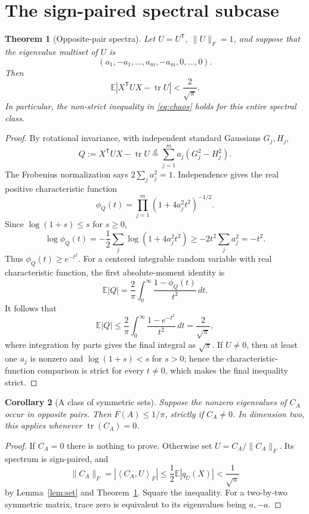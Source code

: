 \documentclass[11pt]{article}
\newtheorem{theorem}{Theorem}
\newtheorem{corollary}[theorem]{Corollary}
\newcommand{\E}{\mathbb E}
\newcommand{\tr}{\operatorname{tr}}
\newcommand{\ip}[2]{\left\langle #1,#2\right\rangle}
\begin{document}
\section{The sign-paired spectral subcase}

\begin{theorem}[Opposite-pair spectra]\label{thm:pairs}
Let $U=U^{\mathsf T}$, $\|U\|_F=1$, and suppose that the eigenvalue multiset
of $U$ is
\[
 (a_1,-a_1,\ldots,a_m,-a_m,0,\ldots,0).
\]
Then
\[
 \E\left|X^{\mathsf T}UX-\tr U\right|<\frac{2}{\sqrt\pi}.
\]
In particular, the non-strict inequality in \eqref{eq:chaos} holds for this
entire spectral class.
\end{theorem}

\begin{proof}
By rotational invariance, with independent standard Gaussians $G_j,H_j$,
\[
 Q:=X^{\mathsf T}UX-\tr U
 \stackrel{d}{=}\sum_{j=1}^m a_j(G_j^2-H_j^2).
\]
The Frobenius normalization says $2\sum_ja_j^2=1$.  Independence gives the
real positive characteristic function
\[
 \phi_Q(t)=\prod_{j=1}^m(1+4a_j^2t^2)^{-1/2}.
\]
Since $\log(1+s)\leq s$ for $s\geq0$,
\[
 \log\phi_Q(t)
 =-\frac12\sum_j\log(1+4a_j^2t^2)
 \geq-2t^2\sum_ja_j^2=-t^2.
\]
Thus $\phi_Q(t)\geq e^{-t^2}$.  For a centered integrable random variable
with real characteristic function, the first absolute-moment identity is
\[
 \E|Q|=\frac2\pi\int_0^\infty\frac{1-\phi_Q(t)}{t^2}\,dt.
\]
It follows that
\[
 \E|Q|\leq\frac2\pi\int_0^\infty
 \frac{1-e^{-t^2}}{t^2}\,dt
 =\frac2{\sqrt\pi},
\]
where integration by parts gives the final integral as $\sqrt\pi$.
If $U\neq0$, then at least one $a_j$ is nonzero and
$\log(1+s)<s$ for $s>0$; hence the characteristic-function comparison is
strict for every $t\neq0$, which makes the final inequality strict.
\end{proof}

\begin{corollary}[A class of symmetric sets]\label{cor:sets}
Suppose the nonzero eigenvalues of $C_A$ occur in opposite pairs.  Then
$F(A)\leq1/\pi$, strictly if $C_A\neq0$.  In dimension two, this applies
whenever $\tr(C_A)=0$.
\end{corollary}

\begin{proof}
If $C_A=0$ there is nothing to prove.  Otherwise set
$U=C_A/\|C_A\|_F$.  Its spectrum is sign-paired, and
\[
 \|C_A\|_F=|\ip{C_A}{U}_F|
 \leq\frac12\E|q_U(X)|<\frac1{\sqrt\pi}
\]
by Lemma~\ref{lem:set} and Theorem~\ref{thm:pairs}.  Square the inequality.
For a two-by-two symmetric matrix, trace zero is equivalent to its
eigenvalues being $a,-a$.
\end{proof}
\end{document}
